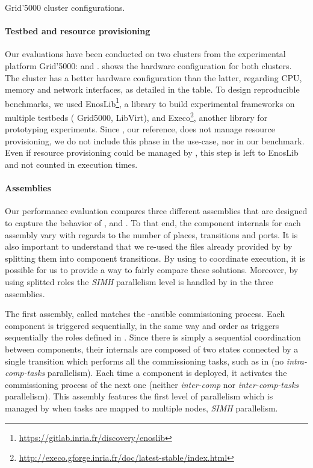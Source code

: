 \begin{table}
  \begin{center}
    \small
    
    \caption{Grid'5000 cluster configurations.}
    \label{tab:g5k}
  \end{center}
\end{table}

\paragraph{Testbed and resource provisioning}
Our evaluations have been conducted on two clusters from the
experimental platform Grid'5000: \ecotype and \nova. 
shows the hardware configuration for both clusters. The cluster
\ecotype has a better hardware configuration than the latter,
regarding CPU, memory and network interfaces, as detailed in the
table. To design reproducible benchmarks, we used
EnosLib\footnote{\url{https://gitlab.inria.fr/discovery/enoslib}}, a
library to build experimental frameworks on multiple testbeds (\eg
Grid5000, LibVirt), and
Execo\footnote{\url{http://execo.gforge.inria.fr/doc/latest-stable/index.html}},
another library for prototyping experiments. Since \kolla, our
reference, does not manage resource provisioning, we do not include
this phase in the use-case, nor in our benchmark. Even if resource
provisioning could be managed by \mad, this step is left to EnosLib
and not counted in execution times.

\paragraph{Assemblies}
Our performance evaluation compares three different assemblies that
are designed to capture the behavior of \ansible, \aeolus and \mad. To
that end, the component internals for each assembly vary with regards
to the number of places, transitions and ports. It is also important
to understand that we re-used the \ansible files already provided by
\kolla by splitting them into component transitions. By using \mad to
coordinate \ansible execution, it is possible for us to provide a way
to fairly compare these solutions. Moreover, by using splitted \kolla
roles the \emph{SIMH} parallelism level is handled by \ansible in the
three assemblies.

The first assembly, called \ansass matches the \kolla-ansible
commissioning process. Each component is triggered sequentially, in
the same way and order as \ansible triggers sequentially the roles
defined in \kolla. Since there is simply a sequential coordination
between components, their internals are composed of two states
connected by a single transition which performs all the commissioning
tasks, such as in \kolla (\ie no \emph{intra-comp-tasks}
parallelism). Each time a component is deployed, it activates the
commissioning process of the next one (\ie neither \emph{inter-comp}
nor \emph{inter-comp-tasks} parallelism). This assembly features the
first level of parallelism which is managed by \ansible when tasks are
mapped to multiple nodes, \ie \emph{SIMH} parallelism.
%


